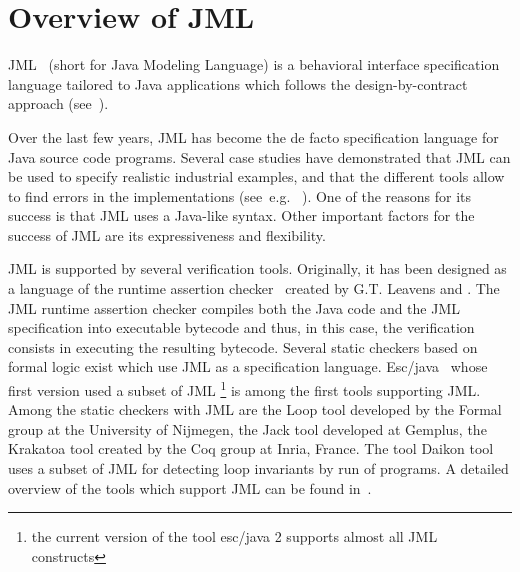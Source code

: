 


\section{Overview of JML} \label{BCSLprelim}
JML~\cite{JMLRefMan} (short for Java Modeling Language) is a behavioral interface specification 
language tailored to Java applications which follows the design-by-contract approach (see~\cite{M97oos}).

Over the last few years, JML has become the de facto specification language for
 Java source code programs. Several case studies have demonstrated that JML can be used to specify realistic
industrial examples, and that the different tools allow to find errors
in the implementations (see~e.g. \/~\cite{BreunesseCHJ04}). One
of the reasons for its success is that JML uses a Java-like
syntax.  Other important factors for the success of JML are its expressiveness and
flexibility.

JML is supported by several verification tools.
 Originally, it has been designed as a language of the runtime assertion checker~\cite{jmlrac} created by G.T. Leavens and . 
The JML runtime assertion checker compiles both the Java code and the JML specification into executable bytecode and thus, 
in this case, the verification consists in executing the resulting bytecode. Several static checkers based 
on formal logic exist which use JML as a specification language. Esc/java~\cite{escjava}  whose first version used a subset 
 of JML \footnote{the current version of the tool esc/java 2  supports almost all JML constructs} is among the first tools supporting JML.
Among the static checkers with JML  are
the Loop tool developed by the Formal group at the University of Nijmegen,
the Jack tool developed at Gemplus, the Krakatoa tool created by the Coq group at Inria, France.
The tool Daikon \cite{ECG01DDL}  tool uses a subset of JML for detecting loop invariants by run of programs.
 A  detailed overview of the tools which support JML can  be found in~\cite{BurdyCCEKLLP03}.



